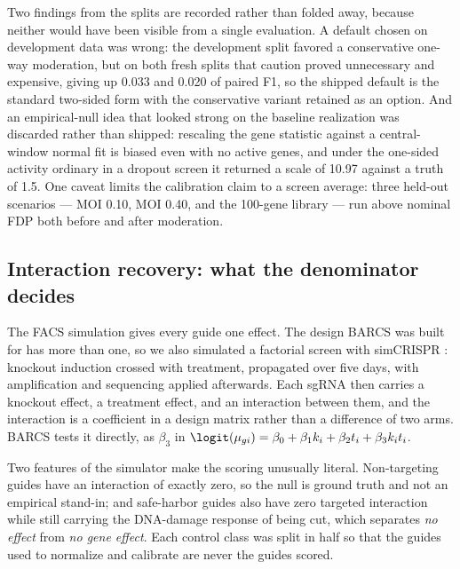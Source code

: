 Two findings from the splits are recorded rather than folded away, because
neither would have been visible from a single evaluation.  A default chosen on
development data was wrong: the development split favored a conservative
one-way moderation, but on both fresh splits that caution proved unnecessary
and expensive, giving up 0.033 and 0.020 of paired F1, so the shipped default
is the standard two-sided form with the conservative variant retained as an
option.  And an empirical-null idea that looked strong on the baseline
realization was discarded rather than shipped: rescaling the gene statistic
against a central-window normal fit is biased even with no active genes, and
under the one-sided activity ordinary in a dropout screen it returned a scale
of 10.97 against a truth of 1.5.  One caveat limits the calibration claim to a
screen average: three held-out scenarios --- MOI 0.10, MOI 0.40, and the
100-gene library --- run above nominal FDP both before and after moderation.

\clearpage
\subsection{Interaction recovery: what the denominator decides}

The FACS simulation gives every guide one effect.  The design BARCS was built
for has more than one, so we also simulated a factorial screen with simCRISPR
\citep{zhu2026simcrispr}: knockout induction crossed with treatment,
propagated over five days, with amplification and sequencing applied
afterwards.  Each sgRNA then carries a knockout effect, a treatment effect,
and an interaction between them, and the interaction is a coefficient in a
design matrix rather than a difference of two arms.  BARCS tests it directly,
as $\beta_3$ in
$\logit(\mu_{gi})=\beta_0+\beta_1k_i+\beta_2t_i+\beta_3k_it_i$.

Two features of the simulator make the scoring unusually literal.
Non-targeting guides have an interaction of exactly zero, so the null is
ground truth and not an empirical stand-in; and safe-harbor guides also have
zero targeted interaction while still carrying the DNA-damage response of
being cut, which separates \emph{no effect} from \emph{no gene effect}.  Each
control class was split in half so that the guides used to normalize and
calibrate are never the guides scored.

